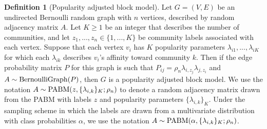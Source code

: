 \documentclass[
  11pt,
]{article}
\theoremstyle{definition}
\newtheorem{definition}{Definition}[section]
\theoremstyle{definition}
\theoremstyle{definition}
\theoremstyle{definition}
\theoremstyle{remark}
\begin{document}
\begin{definition}[Popularity adjusted block model]
\label{def:pabm}
Let $G = (V, E)$ be an undirected Bernoulli random graph with $n$ vertices, described by random adjacency matrix $A$. 
Let $K \geq 1$ be an integer that describes the number of communities, and let 
$z_1, ..., z_n \in \{1, ..., K\}$ be community labels associated with each vertex. 
Suppose that each vertex $v_i$ has $K$ popularity parameters $\lambda_{i1}, ..., \lambda_{iK}$ for which each $\lambda_{ik}$ describes $v_i$'s affinity toward community $k$. 
Then if the edge probability matrix $P$ for this graph is such that $P_{ij} = \rho_n \lambda_{i, z_j} \lambda_{j, z_i}$ and $A \sim \mathrm{BernoulliGraph}(P)$, then $G$ is a popularity adjusted block model.
We use the notation $A \sim \mathrm{PABM}(z, \{\lambda_{i, k}\}_K; \rho_n)$ to denote a random adjacency matrix drawn from the PABM with labels $z$ and popularity parameters $\{\lambda_{i, k}\}_K$. 
Under the sampling scheme in which the labels are drawn from a multivariate distribution with class probabilities $\alpha$, we use the notation $A \sim \mathrm{PABM}(\alpha, \{\lambda_{i, k}\}_K; \rho_n)$. 
\end{definition}
\end{document}
